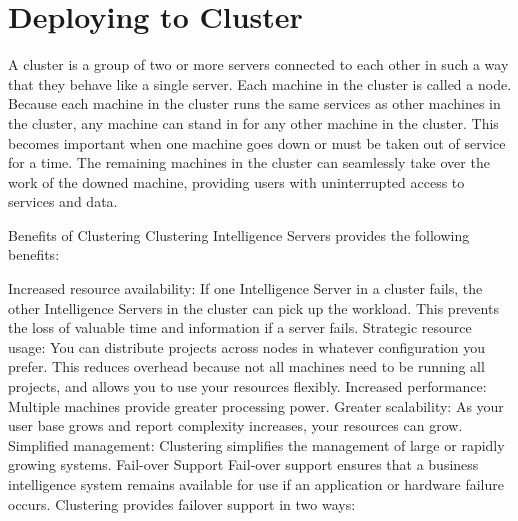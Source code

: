 \documentclass[12pt]{article}
\begin{document}
\begin{itemize}
\begin{figure}[!h]
\end{figure}


\end{itemize}
\clearpage
\newpage
\section{Deploying to Cluster}
A cluster is a group of two or more servers connected to each other in such a way that they behave like a single server. Each machine in the cluster is called a node. Because each machine in the cluster runs the same services as other machines in the cluster, any machine can stand in for any other machine in the cluster. This becomes important when one machine goes down or must be taken out of service for a time. The remaining machines in the cluster can seamlessly take over the work of the downed machine, providing users with uninterrupted access to services and data.

Benefits of Clustering
Clustering Intelligence Servers provides the following benefits:

Increased resource availability: If one Intelligence Server in a cluster fails, the other Intelligence Servers in the cluster can pick up the workload. This prevents the loss of valuable time and information if a server fails.
Strategic resource usage: You can distribute projects across nodes in whatever configuration you prefer. This reduces overhead because not all machines need to be running all projects, and allows you to use your resources flexibly.
Increased performance: Multiple machines provide greater processing power.
Greater scalability: As your user base grows and report complexity increases, your resources can grow.
Simplified management: Clustering simplifies the management of large or rapidly growing systems.
Fail-over Support
Fail-over support ensures that a business intelligence system remains available for use if an application or hardware failure occurs. Clustering provides failover support in two ways:
\end{document}
